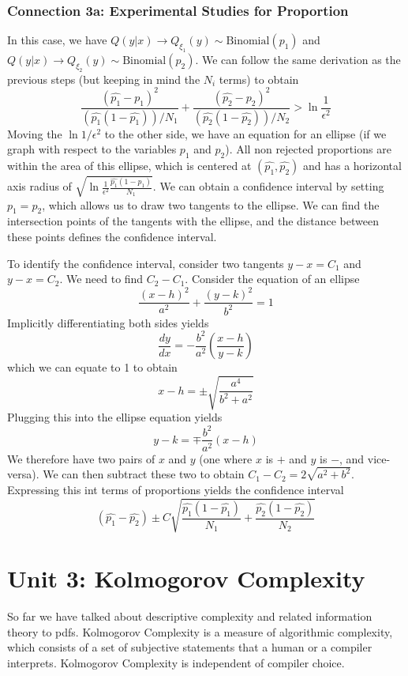 \documentclass[11pt]{article}
\theoremstyle{definition}
\begin{document}
\subsubsection{Connection 3a: Experimental Studies for Proportion}

In this case, we have $Q(y|x) \rightarrow Q_{\xi_1}(y) \sim \text{Binomial}(p_1)$ and $Q(y|x) \rightarrow Q_{\xi_2}(y) \sim \text{Binomial}(p_2)$. We can follow the same derivation as the previous steps (but keeping in mind the $N_i$ terms) to obtain $$\frac{(\hat{p_1} - p_1)^2}{(\hat{p_1}(1 - \hat{p_1}))/N_1} + \frac{(\hat{p_2} - p_2)^2}{(\hat{p_2}(1 - \hat{p_2}))/N_2} > \ln \frac{1}{\epsilon^2}$$Moving the $\ln 1/ \epsilon^2$ to the other side, we have an equation for an ellipse (if we graph with respect to the variables $p_1$ and $p_2$). All non rejected proportions are within the area of this ellipse, which is centered at $(\hat{p_1}, \hat{p_2})$ and has a horizontal axis radius of $\sqrt{\ln \frac{1}{\epsilon^2} \frac{\hat{p_1}(1 - \hat{p_1})}{N_1}}$. We can obtain a confidence interval by setting $p_1 = p_2$, which allows us to draw two tangents to the ellipse. We can find the intersection points of the tangents with the ellipse, and the distance between these points defines the confidence interval. 

To identify the confidence interval, consider two tangents $y - x = C_1$ and $y - x = C_2$. We need to find $C_2 - C_1$. Consider the equation of an ellipse $$\frac{(x-h)^2}{a^2} + \frac{(y-k)^2}{b^2} = 1$$Implicitly differentiating both sides yields $$\frac{dy}{dx} = -\frac{b^2}{a^2} \left( \frac{x-h}{y-k} \right)$$which we can equate to 1 to obtain $$x-h = \pm \sqrt{\frac{a^4}{b^2 + a^2}}$$Plugging this into the ellipse equation yields $$y - k = \mp \frac{b^2}{a^2} (x-h)$$We therefore have two pairs of $x$ and $y$ (one where $x$ is $+$ and $y$ is $-$, and vice-versa). We can then subtract these two to obtain $C_1 - C_2 = 2 \sqrt{a^2 + b^2}$. Expressing this int terms of proportions yields the confidence interval $$(\hat{p_1} - \hat{p_2}) \pm C \sqrt{ \frac{\hat{p_1} ( 1 - \hat{p_1})}{N_1} + \frac{\hat{p_2} (1 - \hat{p_2})}{N_2}}$$

\section{Unit 3: Kolmogorov Complexity}

So far we have talked about descriptive complexity and related information theory to pdfs. Kolmogorov Complexity is a measure of algorithmic complexity, which consists of a set of subjective statements that a human or a compiler interprets. Kolmogorov Complexity is independent of compiler choice. 
\end{document}
